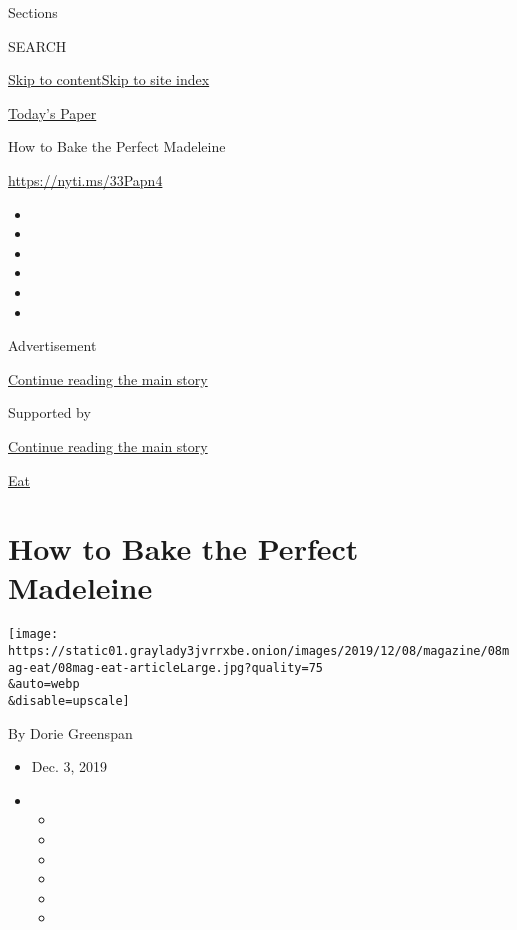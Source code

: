 Sections

SEARCH

\protect\hyperlink{site-content}{Skip to
content}\protect\hyperlink{site-index}{Skip to site index}

\href{https://myaccount.nytimes3xbfgragh.onion/auth/login?response_type=cookie\&client_id=vi}{}

\href{https://www.nytimes3xbfgragh.onion/section/todayspaper}{Today's
Paper}

How to Bake the Perfect Madeleine

\url{https://nyti.ms/33Papn4}

\begin{itemize}
\item
\item
\item
\item
\item
\item
\end{itemize}

Advertisement

\protect\hyperlink{after-top}{Continue reading the main story}

Supported by

\protect\hyperlink{after-sponsor}{Continue reading the main story}

\href{/column/magazine-eat}{Eat}

\hypertarget{how-to-bake-the-perfect-madeleine}{%
\section{How to Bake the Perfect
Madeleine}\label{how-to-bake-the-perfect-madeleine}}

\texttt{[image: https://static01.graylady3jvrrxbe.onion/images/2019/12/08/magazine/08mag-eat/08mag-eat-articleLarge.jpg?quality=75\\\&auto=webp\\\&disable=upscale]}

By Dorie Greenspan

\begin{itemize}
\item
  Dec. 3, 2019
\item
  \begin{itemize}
  \item
  \item
  \item
  \item
  \item
  \item
  \end{itemize}
\end{itemize}

